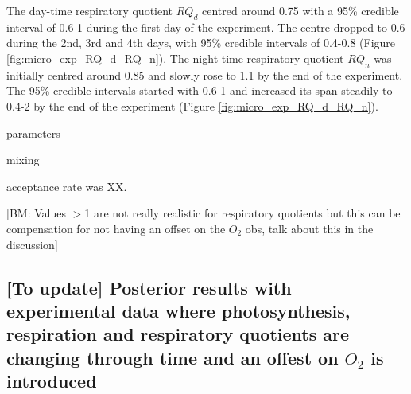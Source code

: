 \documentclass{ruthesis}
\begin{document}
The day-time respiratory quotient $RQ_d$ centred around 0.75 with a 95\% credible interval of 0.6-1 during the first day of the experiment. The centre dropped to 0.6 during the 2nd, 3rd and 4th days, with 95\% credible intervals of 0.4-0.8 (Figure \ref{fig:micro_exp_RQ_d_RQ_n}). The night-time respiratory quotient $RQ_n$ was initially centred around 0.85 and slowly rose to 1.1 by the end of the experiment. The 95\% credible intervals started with 0.6-1 and increased its span steadily to 0.4-2 by the end of the experiment (Figure \ref{fig:micro_exp_RQ_d_RQ_n}).

parameters

mixing

acceptance rate was XX.


[BM: Values $>$1 are not really realistic for respiratory quotients but this can be compensation for not having an offset on the $O_2$ obs, talk about this in the discussion]





\FloatBarrier
\subsection{[To update] Posterior results with experimental data where photosynthesis, respiration and respiratory quotients are changing through time and an offest on $O_2$ is introduced}
\end{document}
